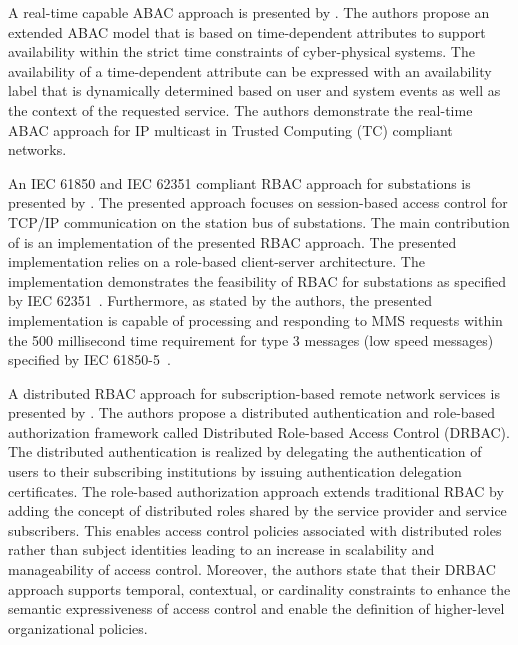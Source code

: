 A real-time capable ABAC approach is presented by \citeauthor{Burmester2013} \cite{Burmester2013}.
The authors propose an extended ABAC model that is based on time-dependent attributes to support availability within the strict time constraints of cyber-physical systems.
The availability of a time-dependent attribute can be expressed with an availability label that is dynamically determined based on user and system events as well as the context of the requested service.
The authors demonstrate the real-time ABAC approach for IP multicast in Trusted Computing (TC) compliant networks.

An IEC 61850 and IEC 62351 compliant RBAC approach for substations is presented by \citeauthor{Lee2015} \cite{Lee2015}.
The presented approach focuses on session-based access control for TCP/IP communication on the station bus of substations.
The main contribution of \citeauthor{Lee2015} is an implementation of the presented RBAC approach.
The presented implementation relies on a role-based client-server architecture.
The implementation demonstrates the feasibility of RBAC for substations as specified by IEC 62351~\cite{IEC62351P8}.
Furthermore, as stated by the authors, the presented implementation is capable of processing and responding to MMS requests within the 500 millisecond time requirement for type 3 messages (low speed messages) specified by IEC 61850-5~\cite{IEC61850P5}.

A distributed RBAC approach for subscription-based remote network services is presented by \citeauthor{Ma2006} \cite{Ma2006a,Ma2006}.
The authors propose a distributed authentication and role-based authorization framework called Distributed Role-based Access Control (DRBAC).
The distributed authentication is realized by delegating the authentication of users to their subscribing institutions by issuing authentication delegation certificates.
The role-based authorization approach extends traditional RBAC by adding the concept of distributed roles shared by the service provider and service subscribers.
This enables access control policies associated with distributed roles rather than subject identities leading to an increase in scalability and manageability of access control.
Moreover, the authors state that their DRBAC approach supports temporal, contextual, or cardinality constraints to enhance the semantic expressiveness of access control and enable the definition of higher-level organizational policies.

